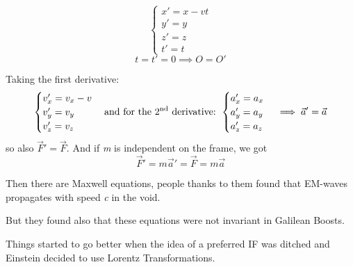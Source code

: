 \begin{minipage}[t]{0.45\textwidth}
\end{minipage}
\begin{minipage}[t]{0.45\textwidth}
    \vspace*{0pt}
    \[ 
    \begin{cases}
    x' = x - vt \\
    y' = y \\
    z' = z \\
    t' = t
\end{cases}\]
      \[
      t = t' = 0 \implies O = O'\]
\end{minipage} 
\bigskip

Taking the first derivative:
\begin{equation}
\begin{cases}
v_{x}' = v_{x} - v \\
v_{y}' = v_{y} \\
v_{z}' = v_{z} \\
\end{cases} \text{and for the 2\textsuperscript{nd} derivative: } \\
\begin{cases}
a_{x}' = a_{x} \\
a_{y}' = a_{y}\\
a_{z}' = a_{z}
\end{cases} \implies \vec{a}' = \vec{a}
\end{equation}
so also $\vec{F}' = \vec{F}$. And if \emph{m} is independent on the frame, we got
\begin{equation}
\vec{F}'=m \vec{a}' = \vec{F} = m \vec{a}
\end{equation}
\bigskip

Then there are Maxwell equations, people thanks to them found that EM-waves propagates with speed \emph{c} in the void. \par
But they found also that these equations were not invariant in Galilean Boosts. \par
Things started to go better when the idea of a preferred IF was ditched and Einstein decided to use Lorentz Transformations.\par

